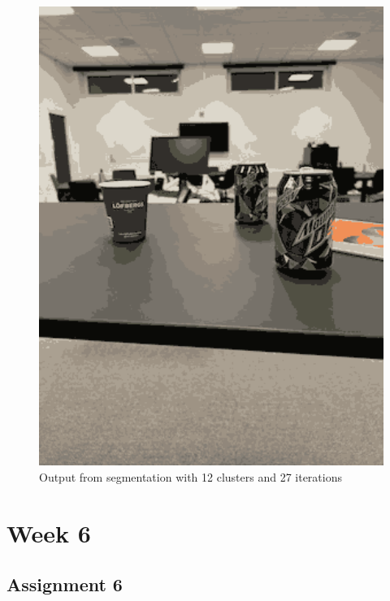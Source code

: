 \documentclass{article}
\begin{document}
\begin{figure}[H]
    \centering
    \includegraphics[width=1\textwidth]{segmented.png} 
    \caption{Output from segmentation with 12 clusters and 27 iterations}
    \label{fig:segOut}
\end{figure}




    \section{Week 6}
    \subsection{Assignment 6}
\end{document}
